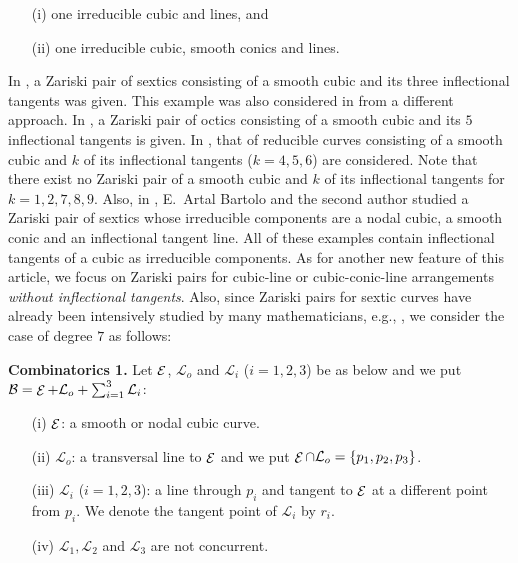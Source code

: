 \documentclass{article}
\newcommand{\mcB}{\mathcal B}
\newcommand{\mcL}{\mathcal L}
\newcommand{\mcE}{\mathop {\cal E}\nolimits}
\begin{document}
 \begin{enumerate}
 \item[(i)] one irreducible cubic and lines, and
 
 \item[(ii)] one irreducible cubic, smooth conics and lines.
 \end{enumerate}
 

In \cite{artal94}, a Zariski pair of sextics consisting of 
 a smooth cubic and its three inflectional tangents was given. This example
was also considered in \cite{tokunaga96} from a different approach. In \cite{benoit-jb}, a Zariski
pair of octics consisting of a smooth cubic and its $5$ inflectional tangents is given. In \cite{bbst},  
that of reducible curves consisting of 
a smooth cubic and  $k$ of its inflectional tangents ($k = 4, 5, 6$) are considered. Note that
there exist no Zariski pair of a smooth cubic and $k$ of its inflectional tangents for $k = 1, 2, 7, 8, 9$.
Also, in \cite{at00}, E.~Artal Bartolo and the second author studied a Zariski pair of sextics whose
irreducible components are a nodal cubic, a smooth conic and an inflectional tangent line.
All of these examples  contain inflectional tangents of a cubic as irreducible components.
As for another new feature of this article,  we focus on  Zariski pairs for cubic-line or cubic-conic-line arrangements 
{\it without inflectional tangents}. Also, since Zariski pairs for sextic curves have already
been intensively studied by many mathematicians, e.g., \cite{oka05, oka06, shimada}, we consider
the case of degree $7$ as follows:



{\bf Combinatorics 1.} Let $\mcE$, $\mcL_o$ and $\mcL_i$ ($i = 1, 2, 3$) be as below and
we put $\mcB = \mcE  + \mcL_o + \sum_{i=1}^3 \mcL_i$:

\begin{enumerate}

\item[(i)] $\mcE$:  a smooth or nodal cubic curve.

\item[(ii)] $\mcL_o$: a transversal line to $\mcE$ and we put $\mcE \cap \mcL_o = \{p_1, p_2, p_3\}$.

\item[(iii)] $\mcL_i$ ($i = 1, 2, 3$): a line through $p_i$ and tangent to  $\mcE$ at a different point from $p_i$.
We denote the tangent point of $\mcL_i$ by $r_i$.

\item[(iv)] $\mcL_1, \mcL_2$ and $\mcL_3$ are not concurrent.

\end{enumerate}
\end{document}

